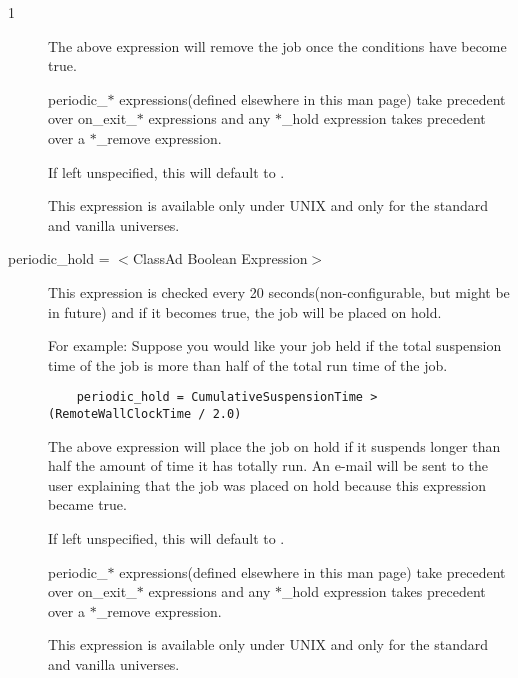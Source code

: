 \begin{ManPage}{\label{man-condor-submit}}{1}
\begin{description}
The above expression will remove the job once the conditions have become true.


periodic\_$*$ expressions(defined elsewhere in this man page) take
precedent over on\_exit\_$*$ expressions and any $*$\_hold expression takes
precedent over a $*$\_remove expression.

If left unspecified, this will default to .

This expression is available only under UNIX and only for the standard and 
vanilla universes.


\item[periodic\_hold = $<$ClassAd Boolean Expression$>$] This expression
is checked every 20 seconds(non-configurable, but might be in future) and
if it becomes true, the job will be placed on hold.

For example:
Suppose you would like your job held if the total suspension time of the
job is more than half of the total run time of the job.

\begin{verbatim}
	periodic_hold = CumulativeSuspensionTime > (RemoteWallClockTime / 2.0)
\end{verbatim}

The above expression will place the job on hold if it suspends longer
than half the amount of time it has totally run.  An e-mail will be
sent to the user explaining that the job was placed on hold because this
expression became true.

If left unspecified, this will default to .

periodic\_$*$ expressions(defined elsewhere in this man page) take
precedent over on\_exit\_$*$ expressions and any $*$\_hold expression takes
precedent over a $*$\_remove expression.

This expression is available only under UNIX and only for the standard and 
vanilla universes.


\end{description}
\end{ManPage}
